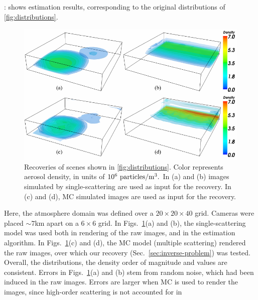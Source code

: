 \documentclass[10pt,letterpaper]{article}
\newcommand{\yoavcomment}[1]{}
\renewcommand{\yoavcomment}[1]{#1} %
\begin{document}
:
 shows estimation results, corresponding to the
original distributions of \cref{fig:distributions}.
\begin{figure}[t]
  \centering
  \yoavcomment{\includegraphics{images/results}}
  \caption{\small Recoveries of scenes shown in
    \cref{fig:distributions}. Color represents aerosol density, in
    units of $10^{6}~{\rm particles}/{\rm m}^3.$ In (a) and (b)
    images simulated by single-scattering are used as input for the
    recovery.  In (c) and (d), MC simulated images are used as input for the
    recovery.  }
  \label{fig:results}
\end{figure}
Here, the atmosphere domain was defined over a
$20\times20 \times 40$ grid. Cameras were placed
$\sim 7$km apart on a $6\times6$ grid.
In Figs.~\ref{fig:results}(a) and (b), the single-scattering model was
used both in rendering of the raw images, and in the estimation algorithm. In
Figs.~\ref{fig:results}(c) and (d), the MC model (multiple scattering)
rendered the raw images, over which our recovery (Sec.~\ref{sec:inverse-problem}) was tested. Overall, the distributions, the density order of magnitude and
values are consistent.
Errors in Figs.~\ref{fig:results}(a) and (b) stem from random noise, which had
been induced in the raw images. Errors are larger when MC is used to
render the images, since high-order scattering is not accounted for in
\end{document}
